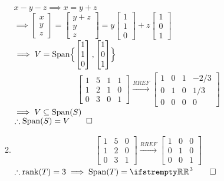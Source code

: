 \documentclass[12pt, a4paper]{article}
\begin{document}
\begin{enumerate}[Q\arabic*.]
\begin{enumerate}[(\alph*)]
        \hfill\\
        $x-y-z\implies x=y+z$\\
        $\implies \begin{bmatrix}x\\y\\z\end{bmatrix} = \begin{bmatrix}y+z\\y\\z\end{bmatrix} = y\begin{bmatrix}1\\1\\0\end{bmatrix} + z\begin{bmatrix}1\\0\\1\end{bmatrix}$\\
        $\implies V = \operatorname{Span} \Bigl\{\begin{bmatrix}1\\1\\0\end{bmatrix}, \begin{bmatrix}1\\0\\1\end{bmatrix}\Bigr\}$
        \begin{align*}
          \begin{bmatrix}
            1 & 5 & 1 & 1\\
            1 & 2 & 1 & 0\\
            0 & 3 & 0 & 1
          \end{bmatrix}\xrightarrow{RREF}
          \begin{bmatrix}
            1 & 0 & 1 & -2/3\\
            0 & 1 & 0 & 1/3\\
            0 & 0 & 0 & 0
          \end{bmatrix}
        \end{align*}
        $\implies V \subseteq \operatorname{Span}(S)$\\
        $\therefore \operatorname{Span}(S) = V \qed$

     \item 
       \begin{align*}
         \begin{bmatrix}
           1 & 5 & 0\\
           1 & 2 & 0\\
           0 & 3 & 1
         \end{bmatrix}\xrightarrow{RREF}
         \begin{bmatrix}
           1 & 0 & 0\\
           0 & 1 & 0\\
           0 & 0 & 1
         \end{bmatrix}
       \end{align*}
       $\therefore \rank(T) = 3 \implies \Span(T) = \RR^3 \qed$
    \end{enumerate}


\end{enumerate}
\end{document}
